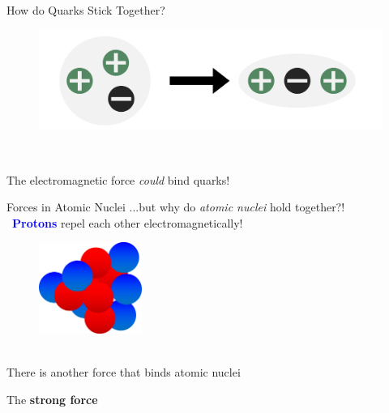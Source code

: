 \begin{frame}{How do Quarks Stick Together?}  
    \begin{figure}[htb]
        \includegraphics[width=1\textwidth]{Figures Introductory Lecture/Standard Model/StrongForce_EM.png}
        \label{fig:strong_force_1}
    \end{figure} \\
    \Large \begin{center}
        The electromagnetic force \emph{could} bind quarks!
    \end{center}
\end{frame}
\begin{frame}{Forces in Atomic Nuclei}
...but why do \emph{atomic nuclei} hold together?!\\ \, \hspace{2cm}  \textcolor{blue}{\textbf{Protons}} repel each other electromagnetically!

    \begin{figure}[htb]
        \includegraphics[width=0.3\textwidth]{Figures Introductory Lecture/Standard Model/Nukleus.png}
        \label{fig:strong_force_2}
    \end{figure}\\
     There is another force that binds atomic nuclei\\ 
    \vspace{0.5cm}\begin{center}
    \Large{The \textbf{strong force}}
    \end{center}
\end{frame}
